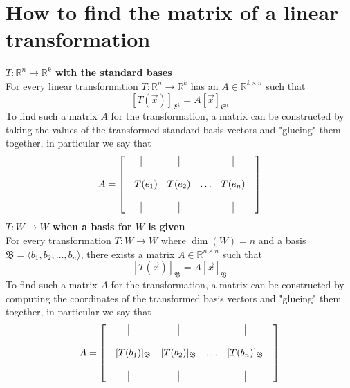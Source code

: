 \documentclass{report}
\begin{document}
\section{How to find the matrix of a linear transformation}
\textbf{$T:\mathbb{R}^n\rightarrow\mathbb{R}^k$ with the standard bases} \\
For every linear transformation $T:\mathbb{R}^n\rightarrow\mathbb{R}^k$ has an $A\in\mathbb{R}^{k\times n}$ such that
$$
[T(\vec{x})]_{\mathfrak{E}^k} = A[\vec{x}]_{\mathfrak{E}^n}
$$
To find such a matrix $A$ for the transformation,  a matrix can be constructed by taking the values of the transformed standard basis vectors and "glueing" them together,  in particular we say that
$$
A = \begin{bmatrix}
\vline&\vline&&\vline\\
&&&&\\
\quad T(e_1)&T(e_2)&\ldots&T(e_n)\\
&&&\\
\vline&\vline&&\vline
\end{bmatrix}
$$
\textbf{$T:W \rightarrow W$ when a basis for $W$ is given} \\
For every transformation $T:W \rightarrow W$ where $\dim(W)=n$ and a basis $\mathfrak{B}=\langle b_1, b_2, \ldots, b_n\rangle$,  there exists a matrix $A\in\mathbb{R}^{n\times n}$ such that
$$
[T(\vec{x})]_\mathfrak{B} = A[\vec{x}]_\mathfrak{B}
$$
To find such a matrix $A$ for the transformation,  a matrix can be constructed by computing the coordinates of the transformed basis vectors and "glueing" them together,  in particular we say that
$$
A = \begin{bmatrix}
\vline&\vline&&\vline\\
&&&&\\
\quad[T(b_1)]_\mathfrak{B}&[T(b_2)]_\mathfrak{B}&\ldots&[T(b_n)]_\mathfrak{B}\\
&&&\\
\vline&\vline&&\vline
\end{bmatrix}
$$
\end{document}
